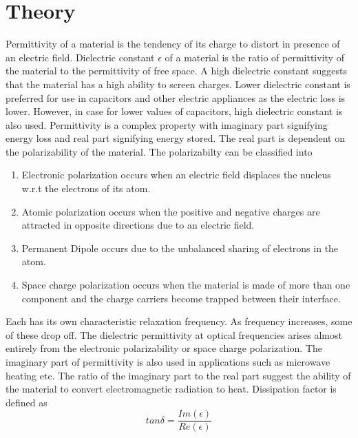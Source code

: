 \documentclass[a4paper, amsfonts, amssymb, amsmath, reprint, showkeys, nofootinbib, twoside]{revtex4-1}
\begin{document}
\section{Theory}
Permittivity of a material is the tendency of its charge to distort in presence of an electric field. Dielectric constant $\epsilon$ of a material is the ratio of permittivity of the material to the permittivity of free space. A high dielectric constant suggests that the material has a high ability to screen charges. Lower dielectric constant is preferred for use in capacitors and other electric appliances as the electric loss is lower. However, in case for lower values of capacitors, high dielectric constant is also used. Permittivity is a complex property with imaginary part signifying energy loss and real part signifying energy stored. The real part is dependent on the polarizability of the material.
The polarizabilty can be classified into
\begin{enumerate}
\item Electronic polarization occurs when an electric field displaces the nucleus w.r.t the electrons of its atom.
\item Atomic polarization occurs when the positive and negative charges are attracted in opposite directions due to an electric field.
\item  Permanent Dipole occurs due to the unbalanced sharing of electrons in the atom.
\item Space charge polarization occurs when the material is made of more than one component and the charge carriers become trapped between their interface.
\end{enumerate}
Each has its own characteristic relaxation frequency. As frequency increases, some of these drop off. The dielectric permittivity at optical frequencies arises almost entirely from the electronic polarizability or space charge polarization.
The imaginary part of permittivity is also used in applications such as microwave heating etc. The ratio of the imaginary part to the real part suggest the ability of the material to convert electromagnetic radiation to heat. Dissipation factor is defined as
\begin{equation}
	tan\delta=\frac{Im(\epsilon)}{Re(\epsilon)}
\end{equation}
\end{document}

